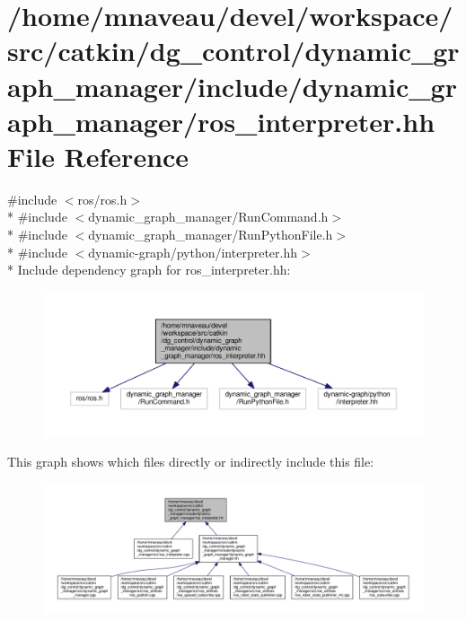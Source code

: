 \hypertarget{ros__interpreter_8hh}{}\section{/home/mnaveau/devel/workspace/src/catkin/dg\+\_\+control/dynamic\+\_\+graph\+\_\+manager/include/dynamic\+\_\+graph\+\_\+manager/ros\+\_\+interpreter.hh File Reference}
\label{ros__interpreter_8hh}
{\ttfamily \#include $<$ros/ros.\+h$>$}\\*
{\ttfamily \#include $<$dynamic\+\_\+graph\+\_\+manager/\+Run\+Command.\+h$>$}\\*
{\ttfamily \#include $<$dynamic\+\_\+graph\+\_\+manager/\+Run\+Python\+File.\+h$>$}\\*
{\ttfamily \#include $<$dynamic-\/graph/python/interpreter.\+hh$>$}\\*
Include dependency graph for ros\+\_\+interpreter.\+hh\+:\nopagebreak
\begin{figure}[H]
\begin{center}
\leavevmode
\includegraphics[width=350pt]{ros__interpreter_8hh__incl}
\end{center}
\end{figure}
This graph shows which files directly or indirectly include this file\+:\nopagebreak
\begin{figure}[H]
\begin{center}
\leavevmode
\includegraphics[width=350pt]{ros__interpreter_8hh__dep__incl}
\end{center}
\end{figure}
